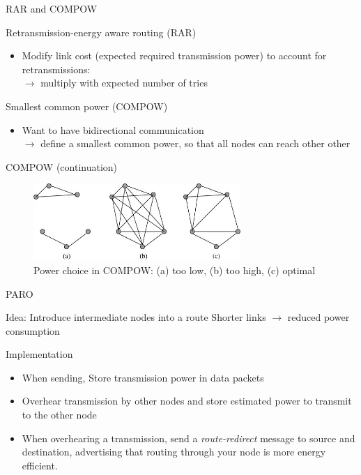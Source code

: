 \documentclass{beamer}
\begin{document}
\begin{frame}{RAR and COMPOW}
\begin{block}{Retransmission-energy aware routing (RAR)\cite{banerjee2002minimum}}
    \begin{itemize}
        \item Modify link cost (expected required transmission power) to account for retransmissions: \\
        $\rightarrow$ multiply with expected number of tries
    \end{itemize}
\end{block}
\begin{block}{Smallest common power (COMPOW)\cite{narayanaswamy2002power}}
    \begin{itemize}
        \item Want to have bidirectional communication\\
            $\rightarrow$ define a smallest common power, so that all nodes can reach other other
    \end{itemize}
\end{block}
\end{frame}
\begin{frame}{COMPOW (continuation)}
\begin{figure}
\centering
\includegraphics[width=0.7\textwidth]{images/compow-level-choice}
\caption{Power choice in COMPOW: (a) too low, (b) too high, (c) optimal}
\label{compow:power-choice}
\end{figure}
\end{frame}

\begin{frame}{PARO\cite{gomez2003paro}}
\begin{block}{Idea: Introduce intermediate nodes into a route}
    Shorter links $\rightarrow$ reduced power consumption
\end{block}
\begin{block}{Implementation}
\begin{itemize}
    \item When sending, Store transmission power in data packets
    \item Overhear transmission by other nodes and store estimated power to transmit to the other node
    \item When overhearing a transmission, send a \textit{route-redirect} message to source and destination,
          advertising that routing through your node is more energy efficient.
\end{itemize}
\end{block}
\end{frame}
\end{document}
